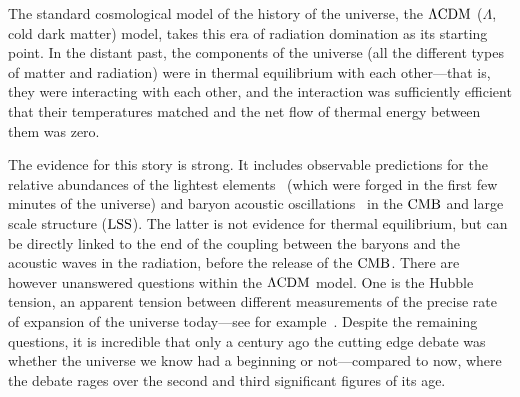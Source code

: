 

    The standard cosmological model of the history of the universe,
    the $\Lambda\text{CDM}$ ($\Lambda$, cold dark matter) model, takes this
    era of radiation domination as its starting point.
    In the distant past, the components of the universe (all the different types of matter and radiation)
    were in thermal equilibrium with each other---that is, they were interacting with each other,
    and the interaction was sufficiently efficient that their temperatures matched
    and the net flow of thermal energy between them was zero.


    The evidence for this story is strong. It includes observable
    predictions for the relative abundances of the lightest
    elements~\cite{peebles_abundances} (which were forged in the first few minutes of the universe)
    and baryon acoustic oscillations~\cite{peebles_bao} in the $\text{CMB}$ and large scale structure ($\text{LSS}$).
    The latter is not evidence for thermal equilibrium,
    but can be directly linked to the end of the coupling
    between the baryons and the acoustic waves in the radiation,
    before the release of the $\text{CMB}$.
    There are however unanswered questions within the $\Lambda\text{CDM}$ model.
    One is the Hubble tension, an apparent tension between different measurements of the
    precise rate of expansion of the universe today---see for example~\cite{tensions_2019, Freedman_2021}.
    Despite the remaining questions, it is incredible that only a century ago the cutting edge debate was
    whether the universe we know had a beginning or not---compared to
    now, where the debate rages over the second and
    third significant figures of its age.


